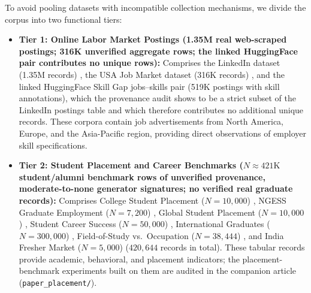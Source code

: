 \documentclass[journal]{IEEEtran}
\begin{document}
To avoid pooling datasets with incompatible collection mechanisms, we divide the corpus into two functional tiers:
\begin{itemize}
    \item \textbf{Tier 1: Online Labor Market Postings (1.35M real web-scraped postings; 316K unverified aggregate rows; the linked HuggingFace pair contributes no unique rows):} Comprises the LinkedIn dataset (1.35M records) \cite{asaniczka2024linkedin}, the USA Job Market dataset (316K records) \cite{batuhanklac2024usa}, and the linked HuggingFace Skill Gap jobs--skills pair (519K postings with skill annotations), which the provenance audit shows to be a strict subset of the LinkedIn postings table and which therefore contributes no additional unique records. These corpora contain job advertisements from North America, Europe, and the Asia-Pacific region, providing direct observations of employer skill specifications.
    \item \textbf{Tier 2: Student Placement and Career Benchmarks ($N \approx 421\text{K}$ student/alumni benchmark rows of unverified provenance, moderate-to-none generator signatures; no verified real graduate records):} Comprises College Student Placement ($N = 10,000$) \cite{sumedh15072024college}, NGESS Graduate Employment ($N = 7,200$) \cite{philipdayo2024ngess}, Global Student Placement ($N = 10,000$) \cite{rakesh6302024global}, Student Career Success ($N = 50,000$) \cite{mobeenfatimah2024career}, International Graduates ($N = 300,000$) \cite{quackquackrp2024international}, Field-of-Study vs.\ Occupation ($N = 38,444$) \cite{jahnavipaliwal2024field}, and India Fresher Market ($N = 5,000$) \cite{shambhurajejagadale2024india} ($420{,}644$ records in total). These tabular records provide academic, behavioral, and placement indicators; the placement-benchmark experiments built on them are audited in the companion article (\texttt{paper\_placement/}).
\end{itemize}
\end{document}
